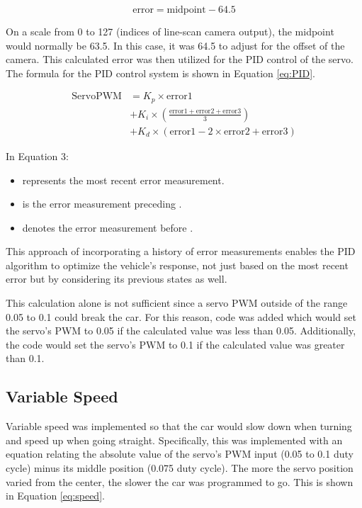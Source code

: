 \documentclass[conference]{IEEEtran}
\begin{document}
\begin{equation}
	\text{error} = \text{midpoint} - 64.5 \label{eq:error}
\end{equation}

On a scale from 0 to 127 (indices of line-scan camera output), the midpoint would normally be 63.5. In this case, it was 64.5 to adjust for the offset of the camera. This calculated error was then utilized for the PID control of the servo. The formula for the PID control system is shown in Equation \ref{eq:PID}.

\begin{equation}
	\begin{aligned}
		\text{ServoPWM} &= K_p \times \text{error1} \\
					&+ K_i \times \left( \frac{\text{error1} + \text{error2} + \text{error3}}{3} \right) \\
					&+ K_d \times (\text{error1} - 2 \times \text{error2} + \text{error3})
	\end{aligned}
	\label{eq:PID}
\end{equation}

In Equation 3:
\begin{itemize}
\item {} represents the most recent error measurement.
\item {} is the error measurement preceding .
\item {} denotes the error measurement before .
\end{itemize}
This approach of incorporating a history of error measurements enables the PID algorithm to optimize the vehicle's response, not just based on the most recent error but by considering its previous states as well.

This calculation alone is not sufficient since a servo PWM outside of the range 0.05 to 0.1 could break the car. For this reason, code was added which would set the servo's PWM to 0.05 if the calculated value was less than 0.05. Additionally, the code would set the servo's PWM to 0.1 if the calculated value was greater than 0.1.

\subsection{Variable Speed}

Variable speed was implemented so that the car would slow down when turning and speed up when going straight. Specifically, this was implemented with an equation relating the absolute value of the servo's PWM input (0.05 to 0.1 duty cycle) minus its middle position (0.075 duty cycle). The more the servo position varied from the center, the slower the car was programmed to go. This is shown in Equation \ref{eq:speed}.
\end{document}
